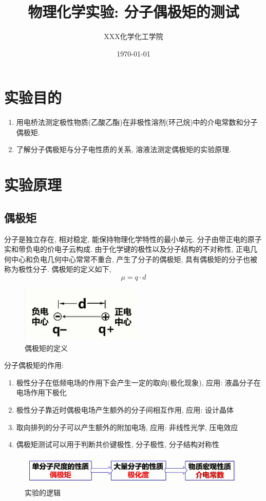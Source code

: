 \documentclass[a4paper]{article}
\title{物理化学实验: 分子偶极矩的测试}
\author{XXX\quad 123456789\quad 化学化工学院}
\date{\today}
\begin{document}
\maketitle
\section{实验目的}
\begin{enumerate}
\item 用电桥法测定极性物质(乙酸乙酯)在非极性溶剂(环己烷)中的介电常数和分子偶极矩.
\item 了解分子偶极矩与分子电性质的关系, 溶液法测定偶极矩的实验原理.
\end{enumerate}
\section{实验原理}
\subsection{偶极矩}
分子是独立存在, 相对稳定, 能保持物理化学特性的最小单元. 
分子由带正电的原子实和带负电的价电子云构成. 
由于化学键的极性以及分子结构的不对称性, 正电几何中心和负电几何中心常常不重合,
产生了分子的偶极矩, 具有偶极矩的分子也被称为极性分子. 偶极矩的定义如下,
\begin{equation}
	\mu = q \cdot d
\end{equation}
\begin{figure}[H]
	\begin{center}
		\includegraphics[width = 0.3\paperwidth]{fig/definition.png}
	\end{center}
	\caption{偶极矩的定义}
\end{figure}
分子偶极矩的作用: 
\begin{enumerate}
	\item 极性分子在低频电场的作用下会产生一定的取向(极化现象), 应用: 液晶分子在电场作用下极化
	\item 极性分子靠近时偶极电场产生额外的分子间相互作用, 应用: 设计晶体
	\item 取向排列的分子可以产生额外的附加电场, 应用: 非线性光学, 压电效应
	\item 偶极矩测试可以用于判断共价键极性, 分子极性, 分子结构对称性
\end{enumerate}
\begin{figure}[H]
	\centering
	\includegraphics[width = 0.5\paperwidth]{fig/logic.png}
	\caption{实验的逻辑}
\end{figure}
\end{document}
